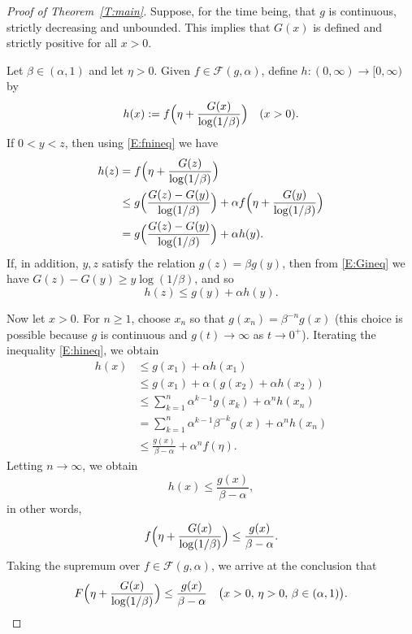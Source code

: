\documentclass[11pt,reqno]{amsart}
\theoremstyle{plain}
\theoremstyle{definition}
\theoremstyle{remark}
\newcommand{\cF}{\mathcal{F}}
\begin{document}
\begin{proof}[Proof of Theorem~\ref{T:main}]
Suppose, for the time being, 
that $g$ is continuous, strictly decreasing and unbounded.
This implies that $G(x)$ is defined and strictly positive for all $x>0$.

Let $\beta\in(\alpha,1)$ and let $\eta>0$.
Given $f\in\cF(g,\alpha)$,
define $h:(0,\infty)\to[0,\infty)$ by
\[
h(x):=f\Bigl(\eta+ \frac{G(x)}{\log(1/\beta)}\Bigr)
\quad(x>0).
\]
If $0<y<z$, then
using \eqref{E:fnineq} we have
\begin{align*}
h(z)
&=f\Bigl(\eta+\frac{G(z)}{\log(1/\beta)}\Bigr)\\
&\le g\Bigl(\frac{G(z)-G(y)}{\log(1/\beta)}\Bigr)
+\alpha f\Bigl(\eta+\frac{G(y)}{\log(1/\beta)}\Bigr)\\
&= g\Bigl(\frac{G(z)-G(y)}{\log(1/\beta)}\Bigr)+\alpha h(y).
\end{align*}
If, in addition, $y,z$ satisfy the relation $g(z)=\beta g(y)$, 
then from \eqref{E:Gineq} we have $G(z)-G(y)\ge y\log(1/
\beta)$, and so
\begin{equation}\label{E:hineq}
h(z)\le g(y)+ \alpha h(y).
\end{equation}

Now let $x>0$. For
$n\ge1$, choose  $x_n$ so that $g(x_n)=\beta^{-n}g(x)$
(this choice is possible because $g$ is continuous and 
$g(t)\to\infty$ as $t\to0^+$).
Iterating the  inequality \eqref{E:hineq}, we obtain
\begin{align*}
h(x)
&\le g(x_1)+\alpha h(x_1)\\
&\le g(x_1)+\alpha (g(x_2)+\alpha h(x_2))\\
&\le \sum_{k=1}^n \alpha^{k-1}g(x_k)+\alpha^nh(x_n)\\
&= \sum_{k=1}^n \alpha^{k-1}\beta^{-k}g(x)+\alpha^nh(x_n)\\
&\le\frac{g(x)}{\beta-\alpha}+\alpha^{n}f(\eta).
\end{align*}
Letting $n\to\infty$, we obtain
\[
h(x)\le \frac{g(x)}{\beta-\alpha},
\]
in other words,
\[
f\Bigl(\eta+\frac{G(x)}{\log(1/\beta)}\Bigr)
\le\frac{g(x)}{\beta-\alpha}.
\]
Taking the supremum over $f\in\cF(g,\alpha)$, we 
arrive at the conclusion that
\begin{equation}\label{E:complicated}
F\Bigl(\eta+\frac{G(x)}{\log(1/\beta)}\Bigr)
\le\frac{g(x)}{\beta-\alpha} \quad\bigl(x>0,\,\eta>0,\,\beta\in(\alpha,1)\bigr).
\end{equation}


\end{proof}
\end{document}
